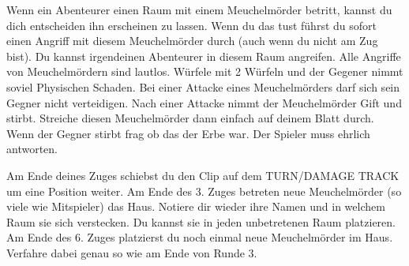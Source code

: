   \begin{itemize}
        \bitem Wenn ein Abenteurer einen Raum mit einem Meuchelmörder betritt, kannst du dich entscheiden ihn erscheinen zu lassen. Wenn du das tust führst du sofort einen Angriff mit diesem Meuchelmörder durch (auch wenn du nicht am Zug bist). Du kannst irgendeinen Abenteurer in diesem Raum angreifen.
        \bitem Alle Angriffe von Meuchelmördern sind lautlos. Würfele mit 2 Würfeln und der Gegener nimmt soviel Physischen Schaden. Bei einer Attacke eines Meuchelmörders darf sich sein Gegner nicht verteidigen.
        \bitem Nach einer Attacke nimmt der Meuchelmörder Gift und stirbt. Streiche diesen Meuchelmörder dann einfach auf deinem Blatt durch.
        \bitem Wenn der Gegner stirbt frag ob das der Erbe war. Der Spieler muss ehrlich antworten.
    \end{itemize}

      \begin{itemize}
            \bitem Am Ende deines Zuges schiebst du den Clip auf dem TURN/DAMAGE TRACK um eine Position weiter.
            \bitem Am Ende des 3. Zuges betreten neue Meuchelmörder (so viele wie Mitspieler) das Haus. Notiere dir wieder ihre Namen und in welchem Raum sie sich verstecken. Du kannst sie in jeden unbetretenen Raum platzieren.
            \bitem Am Ende des 6. Zuges platzierst du noch einmal neue Meuchelmörder im Haus. Verfahre dabei genau so wie am Ende von Runde 3.
        \end{itemize}


